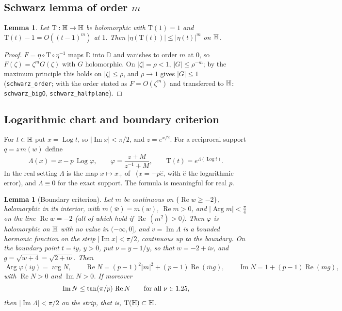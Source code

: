 \documentclass[10pt,a4paper]{article}
\theoremstyle{plain}
\newtheorem{lemma}[theorem]{Lemma}
\theoremstyle{remark}
\numberwithin{equation}{section}
\newcommand{\D}{\mathbb{D}}
\newcommand{\Tm}{\mathrm{T}}
\DeclareMathOperator{\re}{Re}\DeclareMathOperator{\im}{Im}
\DeclareMathOperator{\Arg}{Arg}\DeclareMathOperator{\Log}{Log}
\newcommand{\lean}[1]{\texttt{#1}}
\begin{document}
\subsection{Schwarz lemma of order \texorpdfstring{$m$}{m}}

\begin{lemma}\label{lem:schwarz}
Let $\Tm:\Hp\to\Hp$ be holomorphic with $\Tm(1)=1$ and $\Tm(t)-1=O((t-1)^{m})$ at $1$. Then
$|\eta(\Tm(t))|\le|\eta(t)|^{m}$ on $\mathbb{H}$.
\end{lemma}

\begin{proof}
$F=\eta\circ\Tm\circ\eta^{-1}$ maps $\D$ into $\D$ and vanishes to order $m$ at $0$, so
$F(\zeta)=\zeta^{m}G(\zeta)$ with $G$ holomorphic. On $|\zeta|=\rho<1$, $|G|\le\rho^{-m}$; by the
maximum principle this holds on $|\zeta|\le\rho$, and $\rho\to1$ gives $|G|\le1$
(\lean{schwarz\_order}; with the order stated as $F=O(\zeta^{m})$ and transferred to $\mathbb{H}$:
\lean{schwarz\_bigO}, \lean{schwarz\_halfplane}).
\end{proof}

\subsection{Logarithmic chart and boundary criterion}

For $t\in\mathbb{H}$ put $x=\Log t$, so $|\im x|<\pi/2$, and $z=e^{x/2}$. For a reciprocal support
$q=z\,m(w)$ define
\begin{equation}\label{eq:Lambda}
  \Lambda(x)=x-p\,\Log\varphi,\qquad \varphi=\frac{z+M}{z^{-1}+M},\qquad \Tm(t)=e^{\Lambda(\Log t)} .
\end{equation}
In the real setting $\Lambda$ is the map $x\mapsto x_+$ of~\cite{v28} ($x=-p\hat e$, with $\hat e$
the logarithmic error), and $\Lambda\equiv0$ for the exact support. The formula is meaningful for
real $p$.

\begin{lemma}[Boundary criterion]\label{lem:boundary}
Let $m$ be continuous on $\{\re w\ge-2\}$, holomorphic in its interior, with $m(\bar w)=\overline{m(w)}$,
$\re m>0$, and $|\Arg m|<\frac\pi4$ on the line $\re w=-2$ (all of which hold if $\re\,(m^{2})>0$).
Then $\varphi$ is holomorphic on $\mathbb{H}$ with no value in $(-\infty,0]$,
and $v=\im\Lambda$ is a bounded harmonic function on the strip $|\im x|<\pi/2$, continuous up to the
boundary. On the boundary point $t=iy$, $y>0$, put $\nu=y-1/y$, so that $w=-2+i\nu$, and
$g=\sqrt{w+4}=\sqrt{2+i\nu}$. Then
\begin{equation}\label{eq:N}
 \Arg\varphi(iy)=\arg N,\qquad
 \re N=(p-1)^{2}|m|^{2}+(p-1)\re(\bar m g),\qquad \im N=1+(p-1)\re(mg),
\end{equation}
with $\re N>0$ and $\im N>0$. If moreover
\begin{equation}\label{eq:U}
  \im N\le\tan(\pi/p)\,\re N\qquad\text{for all }\nu\in\R ,
\end{equation}
then $|\im\Lambda|<\pi/2$ on the strip, that is, $\Tm(\Hp)\subset\Hp$.
\end{lemma}
\end{document}
